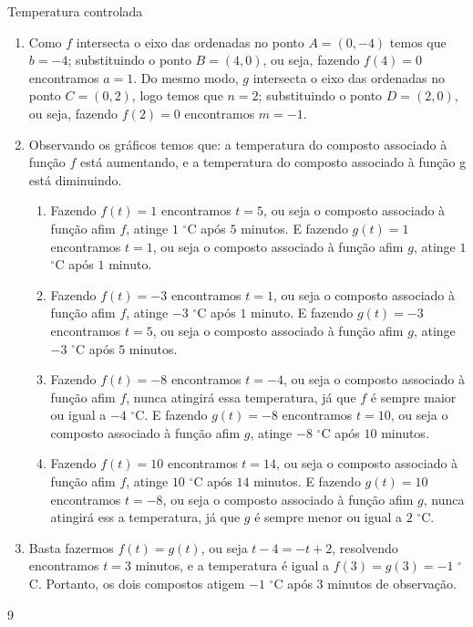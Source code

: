 \begin{answer}{Temperatura controlada}
{
\begin{enumerate}

\item Como $f$ intersecta o eixo das ordenadas no ponto $A=(0,−4)$ temos que $b=−4$; substituindo o ponto $B=(4,0)$, ou seja, fazendo $f(4)=0$ encontramos $a=1$. Do mesmo modo, $g$ intersecta o eixo das ordenadas no ponto $C=(0,2)$, logo temos que $n=2$; substituindo o ponto $D=(2,0)$, ou seja, fazendo $f(2)=0$ encontramos $m=−1$.

\item Observando os gráficos temos que: a temperatura do composto associado à função $f$ está aumentando, e a temperatura do composto associado à função g está diminuindo.
\begin{enumerate}
\item Fazendo $f(t)=1$ encontramos $t=5$, ou seja o composto associado à função afim $f$, atinge $1$ $^{\circ}$C após $5$ minutos. E fazendo $g(t)=1$ encontramos $t=1$, ou seja o composto associado à função afim $g$, atinge $1$ $^{\circ}$C após $1$ minuto.

\item Fazendo $f(t)=−3$ encontramos $t=1$, ou seja o composto associado à função afim $f$, atinge $−3$ $^{\circ}$C após $1$ minuto. E fazendo $g(t)=−3$ encontramos $t=5$, ou seja o composto associado à função afim $g$, atinge $−3$ $^{\circ}$C após $5$ minutos.

\item Fazendo $f(t)=−8$ encontramos $t=−4$, ou seja o composto associado à função afim $f$, nunca atingirá essa temperatura, já que $f$ é sempre maior ou igual a $−4$ $^{\circ}$C. E fazendo $g(t)=−8$ encontramos $t=10$, ou seja o composto associado à função afim $g$, atinge $−8$ $^{\circ}$C após $10$ minutos.

\item Fazendo $f(t)=10$ encontramos $t=14$, ou seja o composto associado à função afim $f$, atinge $10$ $^{\circ}$C após $14$ minutos. E fazendo $g(t)=10$ encontramos $t=−8$, ou seja o composto associado à função afim $g$, nunca atingirá ess a temperatura, já que $g$ é sempre menor ou igual a $2$ $^{\circ}$C.

\end{enumerate}
\item Basta fazermos $f(t)=g(t)$, ou seja $t−4=−t+2$, resolvendo encontramos $t=3$ minutos, e a temperatura é igual a $f(3)=g(3)=−1$ $^{\circ}$C. Portanto, os dois compostos atigem $−1$ $^{\circ}$C após $3$ minutos de observação.

\end{enumerate}
}{9}
\end{answer}
